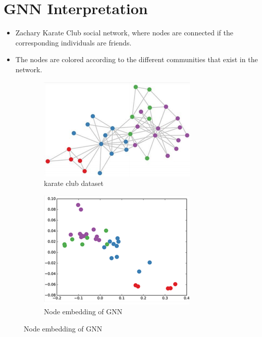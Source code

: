 \section{GNN Interpretation}
    \begin{itemize}
    \item Zachary Karate Club social network, where nodes are connected if the corresponding individuals are friends.
    \item The nodes are colored according to the different communities that exist in the network.
\end{itemize}
    \begin{figure}[h]
    \centering
    \begin{subfigure}[b]{0.5\textwidth}
                \includegraphics[width=\textwidth]{tex/img/dataset.png}
                \caption{karate club dataset}
        \end{subfigure}%
        \hfill
    \begin{subfigure}[b]{0.5\textwidth}
                \includegraphics[width=\textwidth]{tex/img/GEmbed.png}
                \caption{Node embedding of GNN}
       \end{subfigure}%
    \end{figure}
\newpage
